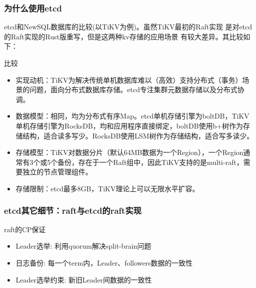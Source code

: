 \documentclass{beamer}
\begin{document}
%
%
\begin{frame}
\frametitle{为什么使用etcd}

etcd和NewSQL数据库的比较(以TiKV为例)。虽然TiKV最初的Raft实现
是对etcd的Raft实现的Rust版重写，但是这两种kv存储的应用场景
有较大差异。其比较如下：

\begin{alertblock}{比较}
    \begin{itemize}
        \item 实现动机：TiKV为解决传统单机数据库难以（高效）支持分布式（事务）场景的问题，面向分布式数据库存储。etcd专注集群元数据存储以及分布式协调。
        \item 数据模型：相同，均为分布式有序Map。etcd单机存储引擎为boltDB，TiKV单机存储引擎为RocksDB，均和应用程序直接绑定，boltDB使用b+树作为存储结构，适合读多写少。RocksDB使用LSM树作为存储结构，适合写多读少。
        \item 存储模型：TiKV对数据分片（默认64MB数据为一个Region），一个Region通常有3个或5个备份，存在于一个Raft组中，因此TiKV支持的是multi-raft，需要独立的节点管理组件。
        \item 存储限制：etcd最多8GB，TiKV理论上可以无限水平扩容。
    \end{itemize}
\end{alertblock}

\end{frame}

%
%
\begin{frame}
    \frametitle{etcd其它细节：raft与etcd的raft实现}
    
    \begin{block}{raft的CP保证}
    \begin{itemize}
        \item Leader选举: 利用quorum解决split-brain问题
        \item 日志备份: 每一个term内，Leader、followers数据的一致性
        \item Leader选举约束: 新旧Leader间数据的一致性
    \end{itemize}
    \end{block}
        
    
    \end{frame}
\end{document}
